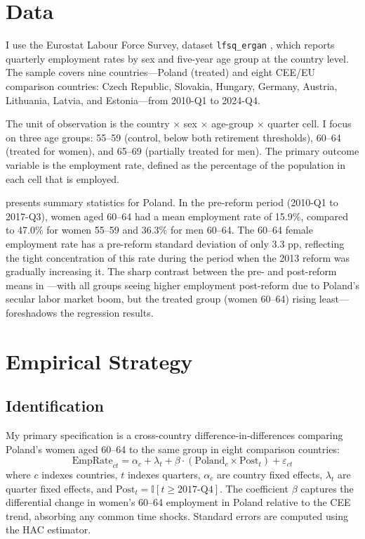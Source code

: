 \documentclass[12pt]{article}
\newcommand{\ind}{\mathbb{I}}
\begin{document}
\section{Data}

I use the Eurostat Labour Force Survey, dataset \texttt{lfsq\_ergan} \citep{eurostat2024lfs}, which reports quarterly employment rates by sex and five-year age group at the country level. The sample covers nine countries---Poland (treated) and eight CEE/EU comparison countries: Czech Republic, Slovakia, Hungary, Germany, Austria, Lithuania, Latvia, and Estonia---from 2010-Q1 to 2024-Q4.

The unit of observation is the country $\times$ sex $\times$ age-group $\times$ quarter cell. I focus on three age groups: 55--59 (control, below both retirement thresholds), 60--64 (treated for women), and 65--69 (partially treated for men). The primary outcome variable is the employment rate, defined as the percentage of the population in each cell that is employed.

 presents summary statistics for Poland. In the pre-reform period (2010-Q1 to 2017-Q3), women aged 60--64 had a mean employment rate of 15.9\%, compared to 47.0\% for women 55--59 and 36.3\% for men 60--64. The 60--64 female employment rate has a pre-reform standard deviation of only 3.3 pp, reflecting the tight concentration of this rate during the period when the 2013 reform was gradually increasing it. The sharp contrast between the pre- and post-reform means in ---with all groups seeing higher employment post-reform due to Poland's secular labor market boom, but the treated group (women 60--64) rising least---foreshadows the regression results.




\section{Empirical Strategy}

\subsection{Identification}

My primary specification is a cross-country difference-in-differences comparing Poland's women aged 60--64 to the same group in eight comparison countries:
\begin{equation}
\text{EmpRate}_{ct} = \alpha_c + \lambda_t + \beta \cdot (\text{Poland}_c \times \text{Post}_t) + \varepsilon_{ct}
\label{eq:crossdd}
\end{equation}
where $c$ indexes countries, $t$ indexes quarters, $\alpha_c$ are country fixed effects, $\lambda_t$ are quarter fixed effects, and $\text{Post}_t = \ind[t \geq \text{2017-Q4}]$. The coefficient $\beta$ captures the differential change in women's 60--64 employment in Poland relative to the CEE trend, absorbing any common time shocks. Standard errors are computed using the \citet{newey1987simple} HAC estimator.
\end{document}
